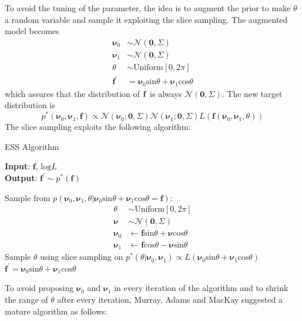 \documentclass{article}
\begin{document}
To avoid the tuning of the parameter, the idea is to augment the prior to make $\theta$ a random variable and sample it exploiting the slice sampling. The augmented model becomes
\begin{align*}
\pmb{\nu}_0&\sim\mathcal{N}(\mathbf{0},\Sigma)\\
\pmb{\nu}_1&\sim\mathcal{N}(\mathbf{0},\Sigma)\\
\theta&\sim \text{Uniform}[0,2\pi]\\
\mathbf{f^{'}}&=\pmb{\nu}_0\text{sin}\theta+\pmb{\nu}_1\text{cos}\theta
\end{align*}
which assures that the distribution of $\bf{f}$ is always $\mathcal{N}(\mathbf{0},\Sigma)$. The new target distribution is $$p^*(\pmb{\nu}_0,\pmb{\nu}_1,\mathbf{f})\propto\mathcal{N}(\pmb{\nu}_0;\mathbf{0},\Sigma)\mathcal{N}(\pmb{\nu}_1;\mathbf{0},\Sigma)L(\mathbf{f}(\pmb{\nu}_0,\pmb{\nu}_1,\theta))$$
The slice sampling exploits the following algorithm:\\

\begin{algorithm}
\caption{ESS Algorithm}\label{ess}
\hspace*{\algorithmicindent} \textbf{Input}: $\mathbf{f},\,\text{log}L$ \\
\hspace*{\algorithmicindent} \textbf{Output}: $\mathbf{f^'}\sim p^*(\mathbf{f})$ 
\begin{algorithmic}[1]
  \State Sample from $p(\pmb{\nu}_0,\pmb{\nu}_1,\theta|\pmb{\nu}_0\text{sin}\theta+\pmb{\nu}_1\text{cos}\theta=\mathbf{f})$:
\begin{align*}
\theta &\sim\text{Uniform}[0,2\pi]\\
\pmb{\nu}&\sim\mathcal{N}(\mathbf{0},\Sigma)\\ 
\pmb{\nu}_0 &\leftarrow\mathbf{f}\text{sin}\theta+\pmb{\nu}\text{cos}\theta\\
\pmb{\nu}_1 &\leftarrow\mathbf{f}\text{cos}\theta-\pmb{\nu}\text{sin}\theta
\end{align*}
  \State Sample $\theta$ using slice sampling on $p^*(\theta|\pmb{\nu}_0,\pmb{\nu}_1)\propto L(\pmb{\nu}_0\text{sin}\theta+\pmb{\nu}_1\text{cos}\theta)$ 
  \State $\mathbf{f^{'}}=\pmb{\nu}_0\text{sin}\theta+\pmb{\nu}_1\text{cos}\theta$
\end{algorithmic}
\end{algorithm}

To avoid proposing $\pmb{\nu}_{0}$ and $\pmb{\nu}_{1}$ in every iteration of the algorithm and to shrink the range of $\theta$ after every iteration, Murray, Adams and MacKay \cite{MAM} 
suggested a mature algorithm as follows:
\end{document}
